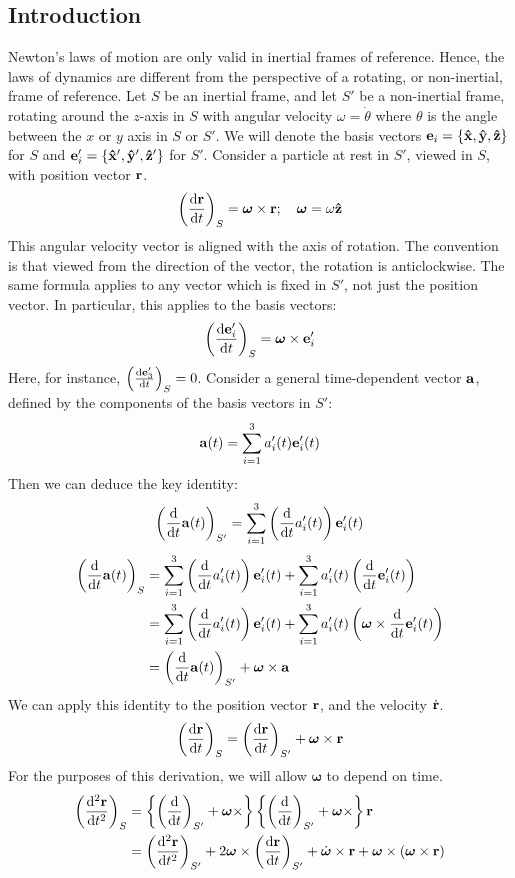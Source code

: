 \subsection{Introduction}
Newton's laws of motion are only valid in inertial frames of reference.
Hence, the laws of dynamics are different from the perspective of a rotating, or non-inertial, frame of reference.
Let \(S\) be an inertial frame, and let \(S'\) be a non-inertial frame, rotating around the \(z\)-axis in \(S\) with angular velocity \(\omega = \dot\theta\) where \(\theta\) is the angle between the \(x\) or \(y\) axis in \(S\) or \(S'\).
We will denote the basis vectors \(\vb e_i = \{ \vu{x}, \vu{y}, \vu{z} \}\) for \(S\) and \(\vb e'_i = \{ \vu{x}', \vu{y}', \vu{z}' \}\) for \(S'\).
Consider a particle at rest in \(S'\), viewed in \(S\), with position vector \(\vb r\).
\[
	\left( \dv{\vb r}{t} \right)_S = \bm\omega \times \vb r;\quad \bm\omega = \omega\vu{z}
\]
This angular velocity vector is aligned with the axis of rotation.
The convention is that viewed from the direction of the vector, the rotation is anticlockwise.
The same formula applies to any vector which is fixed in \(S'\), not just the position vector.
In particular, this applies to the basis vectors:
\[
	\left( \dv{\vb e_i'}{t} \right)_S = \bm\omega \times \vb e_i'
\]
Here, for instance, \(\left( \dv{\vb e_3'}{t} \right)_S = 0\).
Consider a general time-dependent vector \(\vb a\), defined by the components of the basis vectors in \(S'\):
\[
	\vb a(t) = \sum_{i=1}^3 a_i'(t)\vb e'_i(t)
\]
Then we can deduce the key identity:
\[
	\left( \dv{t} \vb a(t) \right)_{S'} = \sum_{i=1}^3\left( \dv{t} a_i'(t)  \right) \vb e'_i(t)
\]
\begin{align*}
	\left( \dv{t} \vb a(t) \right)_{S} & = \sum_{i=1}^3\left( \dv{t} a_i'(t) \right) \vb e'_i(t) + \sum_{i=1}^3 a'_i(t) \left( \dv{t} \vb e_i'(t) \right)                   \\
	                                   & = \sum_{i=1}^3\left( \dv{t} a_i'(t) \right) \vb e'_i(t) + \sum_{i=1}^3 a'_i(t) \left( \bm\omega \times \dv{t} \vb  e_i'(t) \right) \\
	                                   & = \left( \dv{t} \vb a(t) \right)_{S'} + \bm\omega \times \vb a
\end{align*}
We can apply this identity to the position vector \(\vb r\), and the velocity \(\dot{\vb{r}}\).
\[
	\left( \dv{\vb r}{t} \right)_S = \left( \dv{\vb r}{t} \right)_{S'} + \bm\omega \times \vb r
\]
For the purposes of this derivation, we will allow \(\bm\omega\) to depend on time.
\begin{align*}
	\left( \dv[2]{\vb r}{t} \right)_S & = \left\{ \left( \dv{t} \right)_{S'} + \bm\omega \times \right\} \left\{ \left( \dv{t} \right)_{S'} + \bm\omega \times \right\} \vb r                                     \\
	                                  & = \left( \dv[2]{\vb r}{t} \right)_{S'} + 2 \bm\omega \times \left( \dv{\vb r}{t} \right)_{S'} + \dot{\bm\omega} \times \vb r + \bm\omega \times (\bm \omega \times \vb r)
\end{align*}
